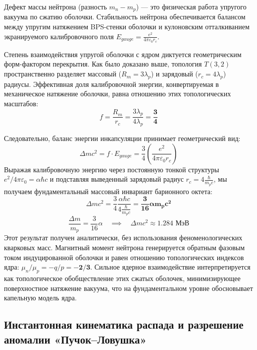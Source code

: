\documentclass[12pt,a4paper]{article}
\begin{document}
	Дефект массы нейтрона (разность $m_n - m_p$) — это физическая работа упругого вакуума по сжатию оболочки. Стабильность нейтрона обеспечивается балансом между упругим натяжением BPS-стенки оболочки и кулоновским отталкиванием экранируемого калибровочного поля $E_{gauge} = \frac{e^2}{4\pi\varepsilon_0 r_c}$.
	
	Степень взаимодействия упругой оболочки с ядром диктуется геометрическим форм-фактором перекрытия. Как было доказано выше, топология $T(3,2)$ пространственно разделяет массовый ($R_m = 3 \lambda_p$) и зарядовый ($r_c = 4 \lambda_p$) радиусы. Эффективная доля калибровочной энергии, конвертируемая в механическое натяжение оболочки, равна отношению этих топологических масштабов:
	\begin{equation}
		f = \frac{R_m}{r_c} = \frac{3 \lambda_p}{4 \lambda_p} = \mathbf{\frac{3}{4}}
	\end{equation}
	
	Следовательно, баланс энергии инкапсуляции принимает геометрический вид:
	\begin{equation}
		\Delta m c^2 = f \cdot E_{gauge} = \frac{3}{4} \left( \frac{e^2}{4\pi\varepsilon_0 r_c} \right)
	\end{equation}
	Выражая калибровочную энергию через постоянную тонкой структуры $e^2 / 4\pi\varepsilon_0 = \alpha \hbar c$ и подставляя выведенный зарядовый радиус $r_c = 4 \frac{\hbar}{m_p c}$, мы получаем фундаментальный массовый инвариант барионного октета:
	\begin{equation}
		\Delta m c^2 = \frac{3}{4} \frac{\alpha \hbar c}{4 \frac{\hbar}{m_p c}} = \mathbf{\frac{3}{16} \alpha m_p c^2}
	\end{equation}
	\begin{equation}
		\frac{\Delta m}{m_p} = \frac{3}{16} \alpha \quad \implies \quad \Delta m c^2 \approx \mathbf{1.284 \text{ МэВ}}
	\end{equation}
	Этот результат получен аналитически, без использования феноменологических кварковых масс. 
	Магнитный момент нейтрона генерируется обратным фазовым током индуцированной оболочки и равен отношению топологических индексов ядра: $\mu_n / \mu_p = -q/p = \mathbf{-2/3}$. 
	Сильное ядерное взаимодействие интерпретируется как топологическое обобществление этих сжатых оболочек, минимизирующее поверхностное натяжение вакуума, что на фундаментальном уровне обосновывает капельную модель ядра.

	\subsection{Инстантонная кинематика распада и разрешение аномалии «Пучок–Ловушка»}
	
\end{document}
